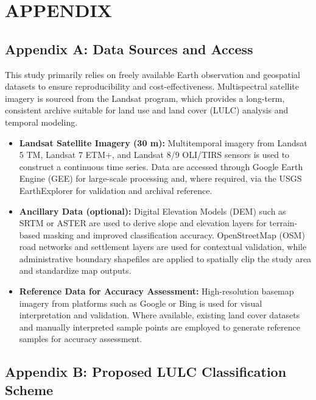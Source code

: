 \documentclass[main]{subfiles}
\begin{document}
\chapter*{\centering \MakeUppercase{Appendix}}

\section*{Appendix A: Data Sources and Access}

This study primarily relies on freely available Earth observation and geospatial datasets to ensure reproducibility and cost-effectiveness. Multispectral satellite imagery is sourced from the Landsat program, which provides a long-term, consistent archive suitable for land use and land cover (LULC) analysis and temporal modeling.

\begin{itemize}
    \item \textbf{Landsat Satellite Imagery (30 m):} Multitemporal imagery from Landsat 5 TM, Landsat 7 ETM+, and Landsat 8/9 OLI/TIRS sensors is used to construct a continuous time series. Data are accessed through Google Earth Engine (GEE) for large-scale processing and, where required, via the USGS EarthExplorer for validation and archival reference.
    
    \item \textbf{Ancillary Data (optional):} Digital Elevation Models (DEM) such as SRTM or ASTER are used to derive slope and elevation layers for terrain-based masking and improved classification accuracy. OpenStreetMap (OSM) road networks and settlement layers are used for contextual validation, while administrative boundary shapefiles are applied to spatially clip the study area and standardize map outputs.
    
    \item \textbf{Reference Data for Accuracy Assessment:} High-resolution basemap imagery from platforms such as Google or Bing is used for visual interpretation and validation. Where available, existing land cover datasets and manually interpreted sample points are employed to generate reference samples for accuracy assessment.
\end{itemize}

\section*{Appendix B: Proposed LULC Classification Scheme}
\end{document}

